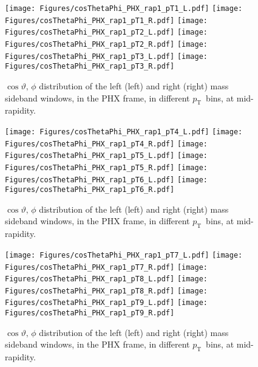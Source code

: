 \documentclass[12pt]{article}
\newcommand{\pt}{$p_{\mathrm{T}}$}
\begin{document}

\begin{figure}[htbp]
\centering
\texttt{[image: Figures/cosThetaPhi\_PHX\_rap1\_pT1\_L.pdf]}
\texttt{[image: Figures/cosThetaPhi\_PHX\_rap1\_pT1\_R.pdf]}
\texttt{[image: Figures/cosThetaPhi\_PHX\_rap1\_pT2\_L.pdf]}
\texttt{[image: Figures/cosThetaPhi\_PHX\_rap1\_pT2\_R.pdf]}
\texttt{[image: Figures/cosThetaPhi\_PHX\_rap1\_pT3\_L.pdf]}
\texttt{[image: Figures/cosThetaPhi\_PHX\_rap1\_pT3\_R.pdf]}
\caption{$\cos\vartheta,\,\phi$ distribution of the left (left) and
  right (right) mass sideband windows, in the PHX frame, in different
  \pt\ bins, at mid-rapidity.}
\end{figure}
\clearpage

\begin{figure}[htbp]
\centering
\texttt{[image: Figures/cosThetaPhi\_PHX\_rap1\_pT4\_L.pdf]}
\texttt{[image: Figures/cosThetaPhi\_PHX\_rap1\_pT4\_R.pdf]}
\texttt{[image: Figures/cosThetaPhi\_PHX\_rap1\_pT5\_L.pdf]}
\texttt{[image: Figures/cosThetaPhi\_PHX\_rap1\_pT5\_R.pdf]}
\texttt{[image: Figures/cosThetaPhi\_PHX\_rap1\_pT6\_L.pdf]}
\texttt{[image: Figures/cosThetaPhi\_PHX\_rap1\_pT6\_R.pdf]}
\caption{$\cos\vartheta,\,\phi$ distribution of the left (left) and
  right (right) mass sideband windows, in the PHX frame, in different
  \pt\ bins, at mid-rapidity.} 
\end{figure}
\clearpage

\begin{figure}[htbp]
\centering
\texttt{[image: Figures/cosThetaPhi\_PHX\_rap1\_pT7\_L.pdf]}
\texttt{[image: Figures/cosThetaPhi\_PHX\_rap1\_pT7\_R.pdf]}
\texttt{[image: Figures/cosThetaPhi\_PHX\_rap1\_pT8\_L.pdf]}
\texttt{[image: Figures/cosThetaPhi\_PHX\_rap1\_pT8\_R.pdf]}
\texttt{[image: Figures/cosThetaPhi\_PHX\_rap1\_pT9\_L.pdf]}
\texttt{[image: Figures/cosThetaPhi\_PHX\_rap1\_pT9\_R.pdf]}
\caption{$\cos\vartheta,\,\phi$ distribution of the left (left) and
  right (right) mass sideband windows, in the PHX frame, in different
  \pt\ bins, at mid-rapidity.}
\end{figure}
\clearpage
\end{document}
